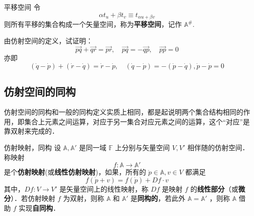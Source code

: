 \begin{definition}{平移空间}
令
\begin{equation}
\alpha t_u+\beta t_v\equiv t_{\alpha u+\beta v}
\end{equation}
则所有平移的集合构成一个矢量空间，称为\textbf{平移空间}，记作 $\mathbb A^{\#}$.
\end{definition}
\begin{example}{}
由仿射空间的定义，试证明：
\begin{equation}
\vec{pq}+\vec{qr}=\vec{pr},\quad \vec{pq}=-\vec{qp},\quad\vec{pp}=0
\end{equation}
亦即
\begin{equation}
(\dot q-\dot p )+(\dot r-\dot q)=\dot r-\dot p,\quad(\dot q-\dot p)=-(\dot p-\dot q),\dot p-\dot p=0
\end{equation}

\end{example}
\subsection{仿射空间的同构}
仿射空间的同构和一般的同构定义实质上相同，都是起说明两个集合结构相同的作用，即集合上元素之间运算，对应于另一集合对应元素之间的运算，这个“对应”是靠双射来完成的．
\begin{definition}{仿射映射，同构}
设 $\mathbb A,\mathbb A'$ 是同一域 $\mathbb F$ 上分别与矢量空间 $V,V'$ 相伴随的仿射空间．称映射 
\begin{equation}
f:\mathbb A\rightarrow\mathbb A' 
\end{equation}
是个\textbf{仿射映射}(或\textbf{线性仿射映射})，如果，所有的 $\dot p\in \mathbb A,v\in V$ 都满足
\begin{equation}
f(\dot p+v)=f(\dot p)+Df\cdot v
\end{equation}
 其中，$Df:V\rightarrow V'$ 是矢量空间上的线性映射，称 $Df$ 是映射 $f$ 的\textbf{线性部分}（或\textbf{微分}）．若仿射映射 $f$ 为双射，则称 $\mathbb A$ 和 $\mathbb A'$ 是\textbf{同构的}，若此外 $\mathbb A=\mathbb A'$ ，则称 $\mathbb A$ 借助 $f$ 实现\textbf{自同构}．
\end{definition}


